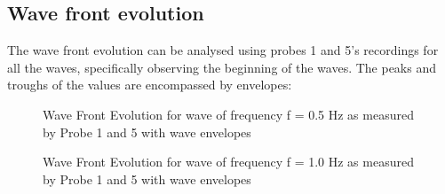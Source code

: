 \documentclass{article}
\begin{document}
	\subsection{Wave front evolution}
	The wave front evolution can be analysed using probes 1 and 5's recordings for all the waves, specifically observing the beginning of the waves. The peaks and troughs of the values are encompassed by envelopes:\\
	\begin{figure}[H]
		\centering
		\caption{Wave Front Evolution for wave of frequency f = 0.5 Hz as measured by Probe 1 and 5 with wave envelopes}
		\label{wave1envelope}
	\end{figure}
	\vspace{-.5cm}
	\begin{figure}[H]
		\centering
		\caption{Wave Front Evolution for wave of frequency f = 1.0 Hz as measured by Probe 1 and 5 with wave envelopes}
		\label{wave2envelope}
	\end{figure}
\end{document}
